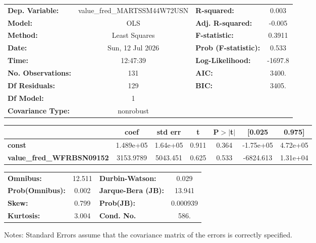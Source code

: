 \begin{center}
\begin{tabular}{lclc}
\toprule
\textbf{Dep. Variable:}           & value\_fred\_MARTSSM44W72USN & \textbf{  R-squared:         } &     0.003   \\
\textbf{Model:}                   &             OLS              & \textbf{  Adj. R-squared:    } &    -0.005   \\
\textbf{Method:}                  &        Least Squares         & \textbf{  F-statistic:       } &    0.3911   \\
\textbf{Date:}                    &       Sun, 12 Jul 2026       & \textbf{  Prob (F-statistic):} &    0.533    \\
\textbf{Time:}                    &           12:47:39           & \textbf{  Log-Likelihood:    } &   -1697.8   \\
\textbf{No. Observations:}        &               131            & \textbf{  AIC:               } &     3400.   \\
\textbf{Df Residuals:}            &               129            & \textbf{  BIC:               } &     3405.   \\
\textbf{Df Model:}                &                 1            & \textbf{                     } &             \\
\textbf{Covariance Type:}         &          nonrobust           & \textbf{                     } &             \\
\bottomrule
\end{tabular}
\begin{tabular}{lcccccc}
                                  & \textbf{coef} & \textbf{std err} & \textbf{t} & \textbf{P$> |$t$|$} & \textbf{[0.025} & \textbf{0.975]}  \\
\midrule
\textbf{const}                    &    1.489e+05  &     1.64e+05     &     0.911  &         0.364        &    -1.75e+05    &     4.72e+05     \\
\textbf{value\_fred\_WFRBSN09152} &    3153.9789  &     5043.451     &     0.625  &         0.533        &    -6824.613    &     1.31e+04     \\
\bottomrule
\end{tabular}
\begin{tabular}{lclc}
\textbf{Omnibus:}       & 12.511 & \textbf{  Durbin-Watson:     } &    0.029  \\
\textbf{Prob(Omnibus):} &  0.002 & \textbf{  Jarque-Bera (JB):  } &   13.941  \\
\textbf{Skew:}          &  0.799 & \textbf{  Prob(JB):          } & 0.000939  \\
\textbf{Kurtosis:}      &  3.004 & \textbf{  Cond. No.          } &     586.  \\
\bottomrule
\end{tabular}
\end{center}

Notes: \newline
 [1] Standard Errors assume that the covariance matrix of the errors is correctly specified.